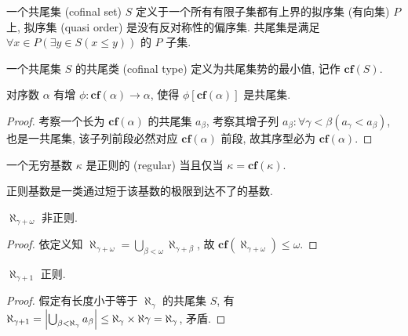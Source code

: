 \begin{definition}
    \label {definition:cofinal set}
    一个共尾集 (cofinal set) \(S\) 定义于一个所有有限子集都有上界的拟序集 (有向集) \(P\) 上, 拟序集 (quasi order) 是没有反对称性的偏序集.
    共尾集是满足 \(\forall x \in P (\exists y \in S (x \le y))\) 的 \(P\) 子集.
\end{definition}

\begin{definition}
    \label {definition:confinal type}
    一个共尾集 \(S\) 的共尾类 (cofinal type) 定义为共尾集势的最小值, 记作 \(\mathbf{cf} (S)\).
\end{definition}

\begin{lemma}
    对序数 \(\alpha\) 有增 \(\phi : \mathbf{cf} (\alpha) \to \alpha\), 使得 \(\phi[\mathbf{cf} (\alpha)]\) 是共尾集.

    \begin{proof}
        考察一个长为 \(\mathbf{cf} (\alpha)\) 的共尾集 \(a_\beta\), 考察其增子列
        \(a_\beta : \forall \gamma < \beta (a_\gamma < a_\beta)\), 也是一共尾集,
        该子列前段必然对应 \(\mathbf{cf} (\alpha)\) 前段, 故其序型必为 \(\mathbf{cf} (\alpha)\).
    \end{proof}
\end{lemma}

\begin{definition}
    \label {definition:regular cardinal}
    一个无穷基数 \(\kappa\) 是正则的 (regular) 当且仅当 \(\kappa = \mathbf{cf} (\kappa)\).
\end{definition}

正则基数是一类通过短于该基数的极限到达不了的基数.

\begin{example}
    \(\aleph_{\gamma + \omega}\) 非正则.

    \begin{proof}
        依定义知 \(\aleph_{\gamma + \omega} = \bigcup_{\beta < \omega} \aleph_{\gamma + \beta}\), 故 \(\mathbf{cf} (\aleph_{\gamma + \omega}) \le \omega\).
    \end{proof}
\end{example}

\begin{example}
    \(\aleph_{\gamma + 1}\) 正则.

    \begin{proof}
        假定有长度小于等于 \(\aleph_{\gamma}\) 的共尾集 \(S\), 有
        \(\aleph_{\gamma + 1} = \abs{\bigcup_{\beta < \aleph_\gamma} a_\beta} \le \aleph_\gamma \times \aleph \gamma = \aleph_\gamma\),
        矛盾.
    \end{proof}
\end{example}

